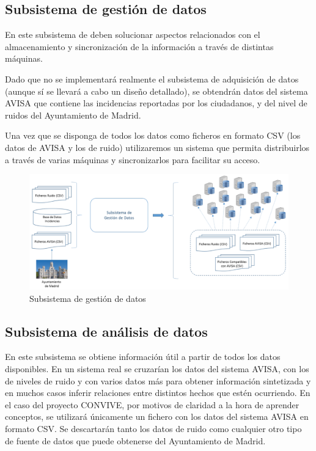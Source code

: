 \documentclass[
  a4paper,
]{scrreport}
\begin{document}
\hypertarget{subsistema-de-gestiuxf3n-de-datos}{%
\subsection{Subsistema de gestión de
datos}\label{subsistema-de-gestiuxf3n-de-datos}}

En este subsistema de deben solucionar aspectos relacionados con el
almacenamiento y sincronización de la información a través de distintas
máquinas.

Dado que no se implementará realmente el subsistema de adquisición de
datos (aunque sí se llevará a cabo un diseño detallado), se obtendrán
datos del sistema AVISA que contiene las incidencias reportadas por los
ciudadanos, y del nivel de ruidos del Ayuntamiento de Madrid.

Una vez que se disponga de todos los datos como ficheros en formato CSV
(los datos de AVISA y los de ruido) utilizaremos un sistema que permita
distribuirlos a través de varias máquinas y sincronizarlos para
facilitar su acceso.

\begin{figure}

{\centering \includegraphics{../img/convive/subsistema-gestion-datos.png}

}

\caption{Subsistema de gestión de datos}

\end{figure}

\hypertarget{subsistema-de-anuxe1lisis-de-datos}{%
\subsection{Subsistema de análisis de
datos}\label{subsistema-de-anuxe1lisis-de-datos}}

En este subsistema se obtiene información útil a partir de todos los
datos disponibles. En un sistema real se cruzarían los datos del sistema
AVISA, con los de niveles de ruido y con varios datos más para obtener
información sintetizada y en muchos casos inferir relaciones entre
distintos hechos que estén ocurriendo. En el caso del proyecto CONVIVE,
por motivos de claridad a la hora de aprender conceptos, se utilizará
únicamente un fichero con los datos del sistema AVISA en formato CSV. Se
descartarán tanto los datos de ruido como cualquier otro tipo de fuente
de datos que puede obtenerse del Ayuntamiento de Madrid.
\end{document}
